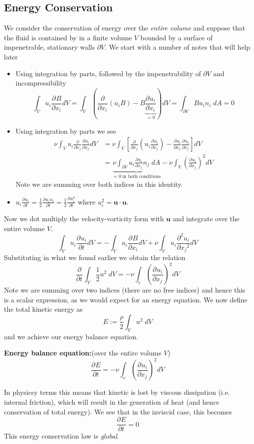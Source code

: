 \documentclass[11pt]{article}
\newcommand*{\pd}[3][]{\ensuremath{\frac{\partial^{#1} {#2}}{\partial {#3}^{#1}}}}
\newcommand{\defeq}{:=}
\newcommand{\mv}[1]{\textbf{#1}}
\newcommand{\mdf}[1]{{\color{red}#1}}
\newenvironment{formula}
	{\begin{mdframed}[backgroundcolor=white, roundcorner=5pt, linewidth=1pt, linecolor=red]}
	{\end{mdframed}}
\begin{document}
\subsection{Energy Conservation}
We consider the conservation of energy over the \emph{entire volume} and suppose that the fluid is contained by in a finite volume $V$ bounded by a surface of impenetrable, stationary walls $\partial V$.
We start with a number of notes that will help later
\begin{itemize}
	\item Using integration by parts, followed by the impenetrability of $\partial V$ and incompressibility
		$$\int_V u_i\pd{B}{x_i}dV=\int_V\left(\pd{}{x_i}(u_iB)-B\underbrace{\pd{u_i}{x_i}}_{=0}\right)dV=\int_{\partial V} Bu_in_i\; dA = 0$$
	\item Using integration by parts we see
		\begin{align*}
			\nu\int_V u_i\pd{}{x_j}\pd{u_i}{x_j}dV &= \nu \int_V \left[\pd{}{x_j}\left(u_i\pd{u_i}{x_j}\right)-\pd{u_i}{x_j}\pd{u_i}{x_j}\right]dV\\
												   &= \underbrace{\nu \int_{\partial V} u_i\pd{u_i}{x_j}n_j\;dA}_{=0\;\text{in both conditions}} - \nu \int_{V} \left(\pd{u_i}{x_j}\right)^2 dV
		\end{align*}
	Note we are summing over both indices in this identity.
\item $u_i\pd{u_i}{t}=\frac{1}{2}\pd{u_iu_i}{t}=\frac{1}{2}\pd{u_i^2}{t}$ where $u_i^2=\mv{u}\cdot{\mv{u}}$.
\end{itemize}
Now we dot multiply the velocity-vorticity form with $\mv{u}$ and integrate over the entire volume $V$.
$$\int_V u_i\pd{u_i}{t}dV = - \int_V u_i\pd{B}{x_i}dV + \nu \int_V u_i\pd[2]{u_i}{x_j}dV$$
Substituting in what we found earlier we obtain the relation
$$\pd{}{t}\int_V\frac{1}{2}u^2\;dV=-\nu\int_v\left(\pd{u_i}{x_j}\right)^2dV$$
Note we are summing over two indices (there are no free indices) and hence this is a scalar expression, as we would expect for an energy equation.
We now define the \mdf{total kinetic energy} as
$$E\defeq \frac{\rho}{2}\int_V u^2\;dV$$
and we achieve our energy balance equation.
\begin{formula}
	\textbf{Energy balance equation:}(over the entire volume $V$)
	$$\pd{E}{t}=-\nu\int_v\left(\pd{u_i}{x_j}\right)^2dV$$
\end{formula}
In physicsy terms this means that kinetic is lost by viscous dissipation (i.e. internal friction), which will result in the generation of heat (and hence conservation of total energy).
We see that in the inviscid case, this becomes
$$\pd{E}{t}=0$$
This energy conservation law is \emph{global}.
\end{document}
